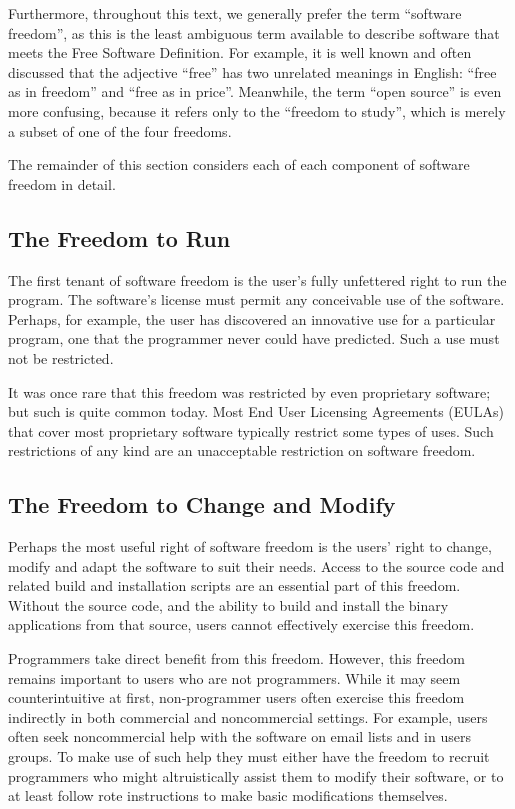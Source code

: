 Furthermore, throughout this text, we generally prefer the term ``software
freedom'', as this is the least ambiguous term available to describe software
that meets the Free Software Definition.  For example, it is well known and
often discussed that the adjective ``free'' has two unrelated meanings in
English: ``free as in freedom'' and ``free as in price''.  Meanwhile, the
term ``open source'' is even more confusing, because it refers only to the
``freedom to study'', which is merely a subset of one of the four freedoms.

The remainder of this section considers each of each component of software
freedom in detail.

\subsection{The Freedom to Run}

The first tenant of software freedom is the user's fully unfettered right to
run the program.  The software's license must permit any conceivable use of
the software.  Perhaps, for example, the user has discovered an innovative
use for a particular program, one that the programmer never could have
predicted.  Such a use must not be restricted.

It was once rare that this freedom was restricted by even proprietary
software; but such is quite common today. Most End User Licensing Agreements
(EULAs) that cover most proprietary software typically restrict some types of
uses.  Such restrictions of any kind are an unacceptable restriction on
software freedom.

\subsection{The Freedom to Change and Modify}

Perhaps the most useful right of software freedom is the users' right to
change, modify and adapt the software to suit their needs.  Access to the
source code and related build and installation scripts are an essential part
of this freedom.  Without the source code, and the ability to build and
install the binary applications from that source, users cannot effectively
exercise this freedom.

Programmers take direct benefit from this freedom.  However, this freedom
remains important to users who are not programmers.  While it may seem
counterintuitive at first, non-programmer users often exercise this freedom
indirectly in both commercial and noncommercial settings.  For example, users
often seek noncommercial help with the software on email lists and in users
groups.  To make use of such help they must either have the freedom to
recruit programmers who might altruistically assist them to modify their
software, or to at least follow rote instructions to make basic modifications
themselves.


